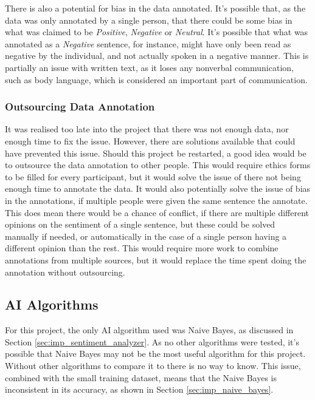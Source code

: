 There is also a potential for bias in the data annotated. It's possible that, as the data was only annotated by a single person, that there could be some bias in what was claimed to be \emph{Positive}, \emph{Negative} or \emph{Neutral}. It's possible that what was annotated as a \emph{Negative} sentence, for instance, might have only been read as negative by the individual, and not actually spoken in a negative manner. This is partially an issue with written text, as it loses any nonverbal communication, such as body language, which is considered an important part of communication\cite{Whaley2007}.

\subsubsection{Outsourcing Data Annotation}

It was realised too late into the project that there was not enough data, nor enough time to fix the issue. However, there are solutions available that could have prevented this issue. Should this project be restarted, a good idea would be to outsource the data annotation to other people. This would require ethics forms to be filled for every participant, but it would solve the issue of there not being enough time to annotate the data. It would also potentially solve the issue of bias in the annotations, if multiple people were given the same sentence the annotate. This does mean there would be a chance of conflict, if there are multiple different opinions on the sentiment of a single sentence, but these could be solved manually if needed, or automatically in the case of a single person having a different opinion than the rest. This would require more work to combine annotations from multiple sources, but it would replace the time spent doing the annotation without outsourcing.

\subsection{AI Algorithms}
\label{sec:evl_AI}
For this project, the only AI algorithm used was Naive Bayes, as discussed in Section \ref{sec:imp_sentiment_analyzer}. As no other algorithms were tested, it's possible that Naive Bayes may not be the most useful algorithm for this project. Without other algorithms to compare it to there is no way to know. This issue, combined with the small training dataset, means that the Naive Bayes is inconsistent in its accuracy, as shown in Section \ref{sec:imp_naive_bayes}.

